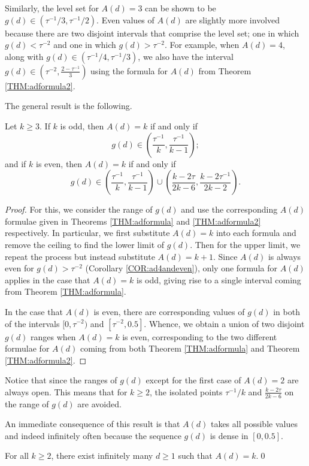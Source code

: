 \documentclass[10pt,a4paper,reqno]{amsart}
\begin{document}
Similarly, the level set for $A(d)=3$ can be shown to be $g(d)\in(\tau^{-1}/3,\tau^{-1}/2)$. Even values of $A(d)$ are slightly more involved because there are two disjoint intervals that comprise the level set; one in which $g(d)<\tau^{-2}$ and one in which $g(d)>\tau^{-2}$. For example, when $A(d)=4$, along with $g(d)\in(\tau^{-1}/4,\tau^{-1}/3)$, we also have the interval $g(d)\in\left(\tau^{-2},\frac{2-\tau^{-1}}{3}\right)$ using the formula for $A(d)$ from Theorem \ref{THM:adformula2}.

The general result is the following.
\begin{prop}\label{PROP:gdranges}
Let $k\geq3$. If $k$ is odd, then $A(d)=k$ if and only if \[g(d)\in\left(\frac{\tau^{-1}}{k},\frac{\tau^{-1}}{k-1}\right);\]
and if $k$ is even, then $A(d)=k$ if and only if \[g(d)\in\left(\frac{\tau^{-1}}{k},\frac{\tau^{-1}}{k-1}\right)\cup\left(\frac{k-2\tau}{2k-6},\frac{k-2\tau^{-1}}{2k-2}\right).\]
\end{prop}
\begin{proof}
    For this, we consider the range of $g(d)$ and use the corresponding $A(d)$ formulae given in Theorems \ref{THM:adformula} and \ref{THM:adformula2} respectively. In particular, we first substitute $A(d)=k$ into each formula and remove the ceiling to find the lower limit of $g(d)$. Then for the upper limit, we repeat the process but instead substitute $A(d)=k+1$. Since $A(d)$ is always even for $g(d)>\tau^{-2}$ (Corollary \ref{COR:ad4andeven}), only one formula for $A(d)$ applies in the case that $A(d)=k$ is odd, giving rise to a single interval coming from Theorem \ref{THM:adformula}.

    In the case that $A(d)$ is even, there are corresponding values of $g(d)$ in both of the intervals $[0,\tau^{-2})$ and $[\tau^{-2},0.5]$. Whence, we obtain a union of two disjoint $g(d)$ ranges when $A(d)=k$ is even, corresponding to the two different formulae for $A(d)$ coming from both Theorem \ref{THM:adformula} and Theorem \ref{THM:adformula2}.
\end{proof}
\begin{rem}Notice that since the ranges of $g(d)$ except for the first case of $A(d)=2$ are always open. This means that for $k\geq2$, the isolated points $\tau^{-1}/k$ and $\frac{k-2\tau}{2k-6}$ on the range of $g(d)$ are avoided.
\end{rem}
An immediate consequence of this result is that $A(d)$ takes all possible values and indeed infinitely often because the sequence $g(d)$ is dense in $[0,0.5]$.
\begin{prop}
For all $k \geq 2$, there exist infinitely many $d \geq 1$ such that $A(d)=k$.\qed
\end{prop}
\end{document}
